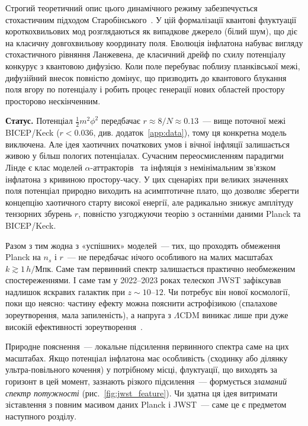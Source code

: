 Строгий теоретичний опис цього динамічного режиму забезпечується стохастичним
підходом Старобінського~\cite{starobinsky_1986}. У цій формалізації квантові флуктуації короткохвильових
мод розглядаються як випадкове джерело (білий шум), що діє на класичну
довгохвильову координату поля. Еволюція інфлатона набуває вигляду стохастичного
рівняння Ланжевена, де класичний дрейф по схилу потенціалу конкурує з квантовою
дифузією. Коли поле перебуває поблизу планківської межі, дифузійний внесок
повністю домінує, що призводить до квантового блукання поля вгору по потенціалу
і робить процес генерації нових областей простору просторово нескінченним.

\textbf{Статус.} Потенціал $\tfrac{1}{2}m^2\phi^2$ передбачає
$r \approx 8/N \approx 0.13$~--- вище поточної межі BICEP/Keck
($r < 0.036$, див. додаток~\ref{app:data}), тому ця конкретна модель виключена.
Але ідея хаотичних початкових умов і вічної інфляції
залишається живою у більш пологих потенціалах.
Сучасним переосмисленням парадигми Лінде є клас моделей
$\alpha$-аттракторів~\cite{ferrara_2013,kallosh_2013}
та інфляція з немінімальним зв'язком інфлатона з кривиною простору-часу.
У цих сценаріях при великих значеннях поля потенціал природно виходить на
асимптотичне плато, що дозволяє зберегти концепцію хаотичного старту високої
енергії, але радикально знижує амплітуду тензорних збурень $r$, повністю
узгоджуючи теорію з останніми даними Planck та BICEP/Keck.

Разом з тим жодна з «успішних» моделей~--- тих, що проходять
обмеження Planck на $n_s$ і $r$~--- не передбачає нічого
особливого на малих масштабах $k \gtrsim 1\,h/$Мпк. Саме там
первинний спектр залишається практично необмеженим
спостереженнями. І саме там у 2022--2023 роках телескоп JWST
зафіксував надлишок яскравих галактик при $z \sim 10$--$12$.
Чи потребує він нової космології, поки що неясно: частину ефекту можна пояснити астрофізикою
(спалахове зореутворення, мала запиленість), а напруга з $\Lambda$CDM виникає лише
при дуже високій ефективності зореутворення~\cite{finkelstein_2023,boylan_kolchin_2023}.

Природне пояснення~--- локальне підсилення первинного спектра
саме на цих масштабах. Якщо потенціал інфлатона має особливість
(сходинку або ділянку ультра-повільного кочення) у потрібному
місці, флуктуації, що виходять за горизонт в цей момент,
зазнають різкого підсилення~--- формується \emph{зламаний спектр
потужності} (рис.~\ref{fig:jwst_feature}). Чи здатна ця ідея витримати зіставлення з повним
масивом даних Planck і JWST~--- саме це є предметом
наступного розділу.

